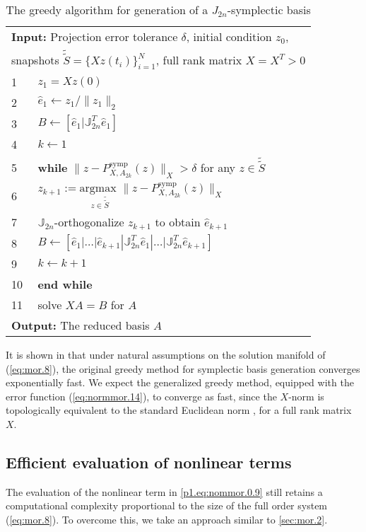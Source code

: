 \begin{table}
\captionsetup{name=Algorithm,type=table}
\caption{The greedy algorithm for generation of a $J_{2n}$-symplectic basis} 
\begin{tabular}{l l}
\multicolumn{2}{l}{{\bf Input:} Projection error tolerance $\delta$, initial condition $ z_0$,}\\
\multicolumn{2}{l}{snapshots $\tilde{\tilde{S}} = \{Xz(t_i)\}_{i=1}^{N}$, full rank matrix $X=X^T>0$} \\
1 & $z_1 = Xz(0)$
\\2 & $\hat e_1 \leftarrow z_1/ \| z_1 \|_2$
\\3 & $B \leftarrow [\hat e_1| \mathbb J_{2n}^T \hat e_1]$
\\4 & $k \leftarrow 1$
\\5 & \textbf{while} $\| z - P^{\text{symp}}_{X,A_{2k}}(z)\|_X > \delta$ for any $z \in \tilde{\tilde{S}}$
\\6 & \hspace{0.5cm} $z_{k+1} := \underset{z\in \tilde{\tilde{S}}}{\text{argmax }} \| z - P^{\text{symp}}_{X,A_{2k}}(z)\|_X$
\\7 & \hspace{0.5cm} $\mathbb J_{2n}$-orthogonalize $z_{k+1}$ to obtain $\hat e_{k+1}$
\\8 & \hspace{0.5cm} $B \leftarrow [\hat e_1|\dots |\hat e_{k+1} | \mathbb J_{2n}^T \hat e_1|\dots| \mathbb J_{2n}^T  \hat e_{k+1}]$
\\9 & \hspace{0.5cm} $k \leftarrow k+1$
\\10 & \textbf{end while}
\\11 & solve $X A = B$ for $A$
\\ \multicolumn{2}{l}{{\bf Output:} The reduced basis $A$}
\end{tabular}
\label{alg:2}
\end{table}

It is shown in \cite{doi:10.1137/17M1111991} that under natural assumptions on the solution manifold of (\ref{eq:mor.8}), the original greedy method for symplectic basis generation converges exponentially fast. We expect the generalized greedy method, equipped with the error function (\ref{eq:normmor.14}), to converge as fast, since the $X$-norm is topologically equivalent to the standard Euclidean norm \cite{friedman1970foundations}, for a full rank matrix $X$.

\subsection{Efficient evaluation of nonlinear terms} \label{sec:normmor.3}
The evaluation of the nonlinear term in \eqref{p1.eq:nommor.0.9} still retains a computational complexity proportional to the size of the full order system (\ref{eq:mor.8}). To overcome this, we take an approach similar to \cref{sec:mor.2}. 

